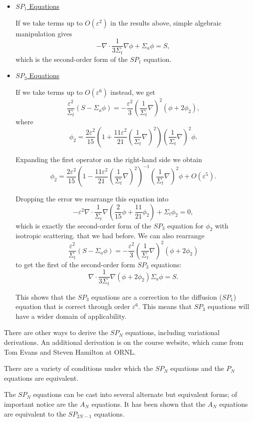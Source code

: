 \documentclass[12pt]{article}
\newcommand{\ep}{\ensuremath{\varepsilon}}
\begin{document}
\begin{itemize}

\item \underline{$SP_1$ Equations}

If we take terms up to $O(\ep^2)$ in the results above, simple algebraic manipulation gives
\[
-\nabla\cdot\frac{1}{3\Sigma_t}\nabla\phi+\Sigma_{a}\phi = S,
\]
which is the second-order form of the $SP_1$ equation.

\item \underline{$SP_3$ Equations}

If we take terms up to $O(\ep^6)$ instead, we get
\[
\frac{\ep^2}{\Sigma_t}(S-\Sigma_a\phi) = -\frac{\ep^2}{3}\left(\frac{1}{\Sigma_t}\nabla\right)^2(\phi+2\phi_2),
\]
where
\[
\phi_2= \frac{2\ep^2}{15}\left(1+\frac{11\ep^2}{21}\left(\frac{1}{\Sigma_t}\nabla\right)^2\right)\left(\frac{1}{\Sigma_t}\nabla\right)^2\phi.
\]

Expanding the first operator on the right-hand side we obtain
\[
\phi_2= \frac{2\ep^2}{15}\left(1-\frac{11\ep^2}{21}\left(\frac{1}{\Sigma_t}\nabla\right)^2\right)^{-1}\left(\frac{1}{\Sigma_t}\nabla\right)^2\phi +O(\ep^5).
\]

Dropping the error we rearrange this equation into
\[
-\ep^2\nabla\cdot\frac{1}{\Sigma_t}\nabla\left(\frac{2}{15}\phi+\frac{11}{21}\phi_2\right)+\Sigma_t\phi_2=0,
\]
which is exactly the second-order form of the $SP_3$ equation for $\phi_2$ with isotropic scattering. that we had before. We can also rearrange
\[
\frac{\ep^2}{\Sigma_t}(S-\Sigma_a\phi) = -\frac{\ep^2}{3}\left(\frac{1}{\Sigma_t}\nabla\right)^2(\phi+2\phi_2)
\]
to get the first of the second-order form $SP_3$ equations:
\[
\nabla\cdot\frac{1}{3\Sigma_t}\nabla(\phi+2\phi_2)\Sigma_a\phi=S.
\]

This shows that the $SP_3$ equations are a
correction to the diffusion ($SP_1$) equation that is correct through
order $\ep^6$. This means that $SP_3$ equations will have a wider domain
of applicability.

\end{itemize}

There are other ways to derive the $SP_N$ equations, including variational derivations. An additional derivation is on the course website, which came from Tom Evans and Steven Hamilton at ORNL.

There are a variety of conditions under which the $SP_N$ equations and the $P_N$ equations are equivalent.

The $SP_N$ equations can be cast into several alternate but equivalent
forms; of important notice are the $A_N$ equations. It has been shown that the $A_N$ equations are equivalent to the $SP_{2N-1}$ equations.
\end{document}
